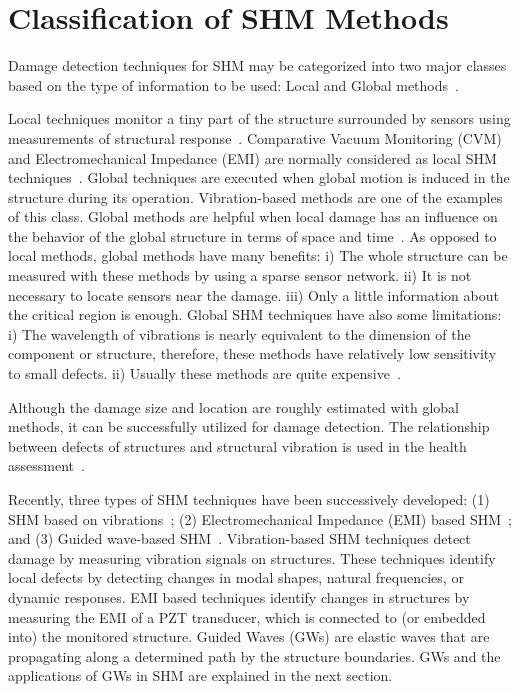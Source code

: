 \documentclass[b5paper, 11pt, titlepage]{book}
\begin{document}
\section{Classification of SHM Methods}
Damage detection techniques for SHM may be categorized into two major classes based on the type of information to be used: Local and Global methods~\cite{lee2008overview, stepinski2013advanced}. 

Local techniques monitor a tiny part of the structure surrounded by sensors using measurements of structural response~\cite{lee2008overview, stepinski2013advanced}. Comparative Vacuum Monitoring (CVM) and Electromechanical Impedance (EMI) are normally considered as local SHM techniques~\cite{Guemes2020a, liang1997coupled, Fiborek2018}.
\newline Global techniques are executed when global motion is induced in the structure during its operation. Vibration-based methods are one of the examples of this class. Global methods are helpful when local damage has an influence on the behavior of the global structure in terms of space and time~\cite{lee2008overview, stepinski2013advanced}. 
As opposed to local methods, global methods have many benefits: 
\newline i) The whole structure can be measured with these methods by using a sparse sensor network.
\newline ii) It is not necessary to locate sensors near the damage.
\newline iii) Only a little information about the critical region is enough. 
Global SHM techniques have also some limitations: 
\newline i) The wavelength of vibrations is nearly equivalent to the dimension of the component or structure, therefore, these methods have relatively low sensitivity to small defects. 
\newline ii) Usually these methods are quite expensive~\cite{ stepinski2013advanced}.

Although the damage size and location are roughly estimated with global methods, it can be successfully utilized for damage detection. The relationship between defects of structures and structural vibration is used in the health assessment~\cite{stepinski2013advanced,Worden2007}. 

Recently, three types of SHM techniques have been successively developed: (1)  SHM based on vibrations~\cite{MMaia}; (2) Electromechanical Impedance (EMI) based SHM~\cite{Fiborek2018}; and (3) Guided wave-based SHM~\cite{Mei2019,Tian2015,Park2014,Sikdar2019,Girolamo2018,Rogge2013,Kudela2018}. Vibration-based SHM techniques detect damage by measuring vibration signals on structures. These techniques identify local defects by detecting changes in modal shapes, natural frequencies, or dynamic responses. EMI based techniques identify changes in structures by measuring the EMI of a PZT transducer, which is connected to (or embedded into) the monitored structure. Guided Waves (GWs) are elastic waves that are propagating along a determined path by the structure boundaries. GWs and the applications of GWs in SHM are explained in the next section.
\end{document}
